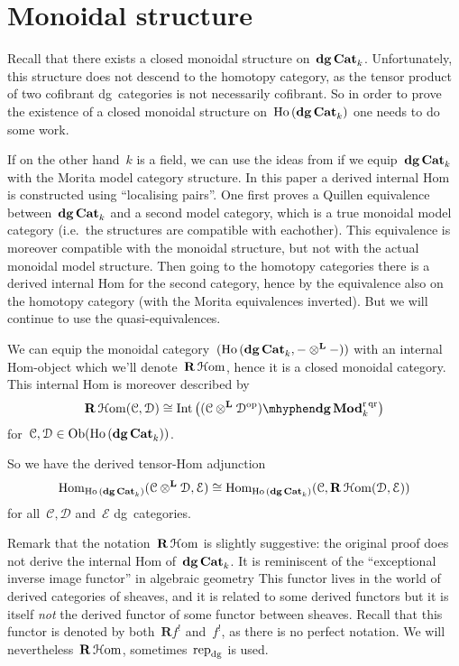 \section{Monoidal structure}
Recall that there exists a closed monoidal structure on~$\mathbf{dg\,Cat}_k$. Unfortunately, this structure does not descend to the homotopy category, as the tensor product of two cofibrant dg~categories is not necessarily cofibrant. So in order to prove the existence of a closed monoidal structure on~$\operatorname{\mathrm{Ho} \,}(\mathbf{dg\,Cat}_k)$ one needs to do some work.

If on the other hand~$k$ is a field, we can use the ideas from \cite{tabuada-3} if we equip~$\mathbf{dg\,Cat}_k$ with the Morita model category structure. In this paper a derived internal Hom is constructed using ``localising pairs''. One first proves a Quillen equivalence between~$\mathbf{dg\,Cat}_k$ and a second model category, which is a true monoidal model category (i.e.\ the structures are compatible with eachother). This equivalence is moreover compatible with the monoidal structure, but not with the actual monoidal model structure. Then going to the homotopy categories there is a derived internal Hom for the second category, hence by the equivalence also on the homotopy category (with the Morita equivalences inverted). But we will continue to use the quasi-equivalences.
\begin{theorem}
  \label{theorem:internal-Hom}
  We can equip the monoidal category~$(\operatorname{\mathrm{Ho} \,}(\mathbf{dg\,Cat}_k,-\otimes^{\mathbf{L}}-))$ with an internal Hom-object which we'll denote~$\mathbf{R}\operatorname{\mathcal{H}om}$, hence it is a closed monoidal category. This internal Hom is moreover described by
  \begin{equation}
    \RRRHHom(\mathcal{C},\mathcal{D})\cong\Int\left( \dgMod{(\mathcal{C}\LLLotimes\mathcal{D}^\opp)}_k^\rqr \right)
  \end{equation}
  for~$\mathcal{C},\mathcal{D}\in\operatorname{Ob}(\operatorname{\mathrm{Ho} \,}(\mathbf{dg\,Cat}_k))$.
\end{theorem}
So we have the derived tensor-Hom adjunction
\begin{equation}
  \label{equation:tensor-Hom-adjunction}
  \mathrm{Hom}_{\operatorname{\mathrm{Ho} \,}(\mathbf{dg\,Cat}_k)}(\mathcal{C}\otimes^{\mathbf{L}}\mathcal{D},\mathcal{E})\cong\mathrm{Hom}_{\operatorname{\mathrm{Ho} \,}(\mathbf{dg\,Cat}_k)}(\mathcal{C},\mathbf{R}\operatorname{\mathcal{H}om}(\mathcal{D},\mathcal{E}))
\end{equation}
for all~$\mathcal{C},\mathcal{D}$ and~$\mathcal{E}$ dg~categories.

Remark that the notation~$\mathbf{R}\operatorname{\mathcal{H}om}$ is slightly suggestive: the original proof does not derive the internal Hom of~$\mathbf{dg\,Cat}_k$. It is reminiscent of the ``exceptional inverse image functor'' in algebraic geometry This functor lives in the world of derived categories of sheaves, and it is related to some derived functors but it is itself \emph{not} the derived functor of some functor between sheaves. Recall that this functor is denoted by both~$\mathbf{R}f^!$ and~$f^!$, as there is no perfect notation. We will nevertheless~$\mathbf{R}\operatorname{\mathcal{H}om}$, sometimes~$\mathrm{rep}_{\mathrm{dg}}$ is used.

